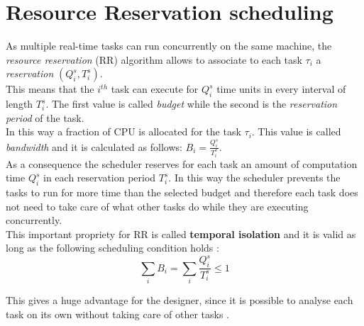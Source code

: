 \section{Resource Reservation scheduling}
As multiple real-time tasks can run concurrently on the same machine, the \emph{resource reservation} (RR) \cite{hardrealtime} algorithm allows to associate to each task \( \tau_{i} \) a \emph{reservation} \( \left(Q_{i}^s, T_{i}^s\right) \).\\ 
This means that the \( i^{th} \) task can execute for \( Q_{i}^s \) time units in every interval of length \( T_{i}^s \). The first value is called \emph{budget} while the second is the \emph{reservation period} of the task.\\
In this way a fraction of CPU is allocated for the task \( \tau_{i} \). This value is called \emph{bandwidth} and it is calculated as follows: \( B_{i} = \frac{Q_{i}^s}{T_{i}^s}\).\\
As a consequence the scheduler reserves for each task an amount of computation time \( Q_{i}^s \) in each reservation period \( T_{i}^s \). In this way the scheduler prevents the tasks to run for more time than the selected budget and therefore each task does not need to take care of what other tasks do while they are executing concurrently.\\
This important propriety for RR is called \textbf{temporal isolation} and it is valid as long as the following scheduling condition holds \cite{realtimehandbook}:
\begin{equation} \tag{1} \label{schedCond}
  \displaystyle\sum_{i} B_{i} =  \displaystyle\sum_{i} \frac{Q_{i}^s}{T_{i}^s} \leq 1
\end{equation}

This gives a huge advantage for the designer, since it is possible to analyse each task on its own without taking care of other tasks \cite{probGuarantees}.

